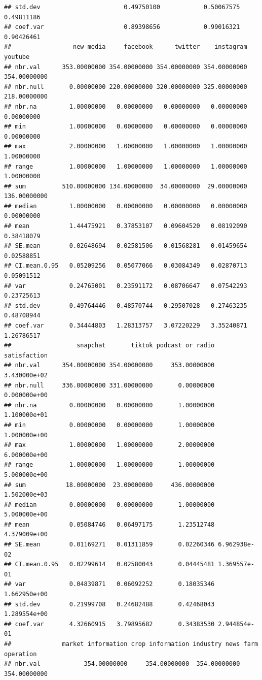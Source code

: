 \documentclass[
]{article}
\begin{document}
\begin{verbatim}
## std.dev                       0.49750100            0.50067575     0.49811186
## coef.var                      0.89398656            0.99016321     0.90426461
##                 new media     facebook      twitter    instagram      youtube
## nbr.val      353.00000000 354.00000000 354.00000000 354.00000000 354.00000000
## nbr.null       0.00000000 220.00000000 320.00000000 325.00000000 218.00000000
## nbr.na         1.00000000   0.00000000   0.00000000   0.00000000   0.00000000
## min            1.00000000   0.00000000   0.00000000   0.00000000   0.00000000
## max            2.00000000   1.00000000   1.00000000   1.00000000   1.00000000
## range          1.00000000   1.00000000   1.00000000   1.00000000   1.00000000
## sum          510.00000000 134.00000000  34.00000000  29.00000000 136.00000000
## median         1.00000000   0.00000000   0.00000000   0.00000000   0.00000000
## mean           1.44475921   0.37853107   0.09604520   0.08192090   0.38418079
## SE.mean        0.02648694   0.02581506   0.01568281   0.01459654   0.02588851
## CI.mean.0.95   0.05209256   0.05077066   0.03084349   0.02870713   0.05091512
## var            0.24765001   0.23591172   0.08706647   0.07542293   0.23725613
## std.dev        0.49764446   0.48570744   0.29507028   0.27463235   0.48708944
## coef.var       0.34444803   1.28313757   3.07220229   3.35240871   1.26786517
##                  snapchat       tiktok podcast or radio satisfaction
## nbr.val      354.00000000 354.00000000     353.00000000 3.430000e+02
## nbr.null     336.00000000 331.00000000       0.00000000 0.000000e+00
## nbr.na         0.00000000   0.00000000       1.00000000 1.100000e+01
## min            0.00000000   0.00000000       1.00000000 1.000000e+00
## max            1.00000000   1.00000000       2.00000000 6.000000e+00
## range          1.00000000   1.00000000       1.00000000 5.000000e+00
## sum           18.00000000  23.00000000     436.00000000 1.502000e+03
## median         0.00000000   0.00000000       1.00000000 5.000000e+00
## mean           0.05084746   0.06497175       1.23512748 4.379009e+00
## SE.mean        0.01169271   0.01311859       0.02260346 6.962938e-02
## CI.mean.0.95   0.02299614   0.02580043       0.04445481 1.369557e-01
## var            0.04839871   0.06092252       0.18035346 1.662950e+00
## std.dev        0.21999708   0.24682488       0.42468043 1.289554e+00
## coef.var       4.32660915   3.79895682       0.34383530 2.944854e-01
##              market information crop information industry news farm operation
## nbr.val            354.00000000     354.00000000  354.00000000   354.00000000

\end{verbatim}
\end{document}
